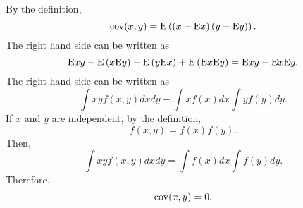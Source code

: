 \subsection{}
\label{subsec_1_6}
By the definition,
%
\begin{equation}
{\rm cov} (x, y) = {\rm E} \left( \left( x - {\rm E} x \right) \left( y - {\rm E} y\right) \right).
\end{equation}
%
The right hand side can be written as
%
\begin{equation}
{\rm E} x y - {\rm E} \left( x {\rm E} y \right) - {\rm E} \left( y {\rm E} x \right) + {\rm E} \left( {\rm E} x {\rm E} y \right) = {\rm E} x y - {\rm E} x {\rm E} y.
\end{equation}
%
The right hand side can be written as
%
\begin{equation}
\int xy f(x, y) dx dy - \int x f(x) dx \int y f(y) dy.
\end{equation}
%
If $x$ and $y$ are independent, by the definition,
%
\begin{equation}
f(x, y) = f(x) f(y).
\end{equation}
%
Then,
%
\begin{equation}
\int x y f(x, y) dx dy = \int f(x) dx \int f(y) dy.
\end{equation}
%
Therefore,
%
\begin{equation}
{\rm cov} (x, y) = 0.
\end{equation}
%


